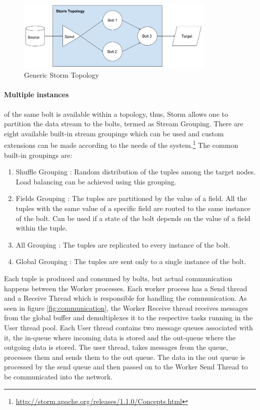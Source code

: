 \documentclass[runningheads,a4paper]{llncs}[2015/06/24]
\begin{document}
\begin{figure}
  \begin{center}
    \includegraphics[width=0.85\textwidth]{topo.png}
    \caption{Generic Storm Topology}
    \label{fig:topo}
   \end{center}
\end{figure}

\paragraph{Multiple instances} of the same bolt is available within a topology, thus, Storm allows one to partition the data stream to the bolts, termed as Stream Grouping. There are eight available built-in stream groupings which can be used and custom extensions can be made according to the needs of the system.\footnote{\url{http://storm.apache.org/releases/1.1.0/Concepts.html}} The common built-in groupings are:

\begin{enumerate}
\item{Shuffle Grouping} : Random distribution of the tuples among the target nodes. Load balancing can be achieved using this grouping.
\item{Fields Grouping} : The tuples are partitioned by the value of a field. All the tuples with the same value of a specific field are routed to the same instance of the bolt. Can be used if a state of the bolt depends on the value of a field within the tuple.
\item{All Grouping} : The tuples are replicated to every instance of the bolt.
\item{Global Grouping} : The tuples are sent only to a single instance of the bolt.
\end{enumerate}

Each tuple is produced and consumed by bolts, but actual communication happens between the Worker processes. Each worker process has a Send thread and a Receive Thread which is responsible for handling the communication. As seen in figure \ref{fig:communication}, the Worker Receive thread receives messages from the global buffer and demultiplexes it to the respective tasks running in the User thread pool. Each User thread contains two message queues associated with it, the in-queue where incoming data is stored and the out-queue where the outgoing data is stored. The user thread, takes messages from the queue, processes them and sends them to the out queue. The data in the out queue is processed by the send queue and then passed on to the Worker Send Thread to be communicated into the network.
\end{document}
